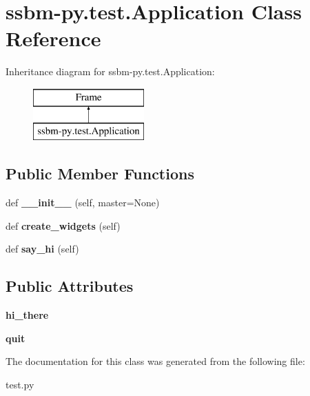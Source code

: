 \hypertarget{classssbm-py_1_1test_1_1_application}{}\section{ssbm-\/py.test.\+Application Class Reference}
\label{classssbm-py_1_1test_1_1_application}
Inheritance diagram for ssbm-\/py.test.\+Application\+:\begin{figure}[H]
\begin{center}
\leavevmode
\includegraphics[height=2.000000cm]{classssbm-py_1_1test_1_1_application}
\end{center}
\end{figure}
\subsection*{Public Member Functions}
\begin{DoxyCompactItemize}
\item 
\mbox{\label{classssbm-py_1_1test_1_1_application_a4cd1acf78c488cd4c7b35323f089fa74}} 
def {\bfseries \+\_\+\+\_\+init\+\_\+\+\_\+} (self, master=None)
\item 
\mbox{\label{classssbm-py_1_1test_1_1_application_ad8d1cb4e9e95923fae411c2db34e5a5f}} 
def {\bfseries create\+\_\+widgets} (self)
\item 
\mbox{\label{classssbm-py_1_1test_1_1_application_acda31132b755d4d924f77fb94abf936c}} 
def {\bfseries say\+\_\+hi} (self)
\end{DoxyCompactItemize}
\subsection*{Public Attributes}
\begin{DoxyCompactItemize}
\item 
\mbox{\label{classssbm-py_1_1test_1_1_application_a61b42a08e6b1e1013cafbb108a72157a}} 
{\bfseries hi\+\_\+there}
\item 
\mbox{\label{classssbm-py_1_1test_1_1_application_a7ee8f905edc946e603586c694c641136}} 
{\bfseries quit}
\end{DoxyCompactItemize}


The documentation for this class was generated from the following file\+:\begin{DoxyCompactItemize}
\item 
test.\+py\end{DoxyCompactItemize}

